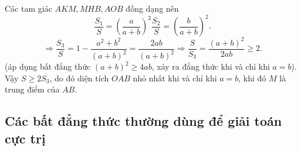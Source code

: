 \begin{vd}
{{
		}
		Các tam giác $AKM, MHB, AOB$ đồng dạng nên $$\frac{S_1}{S}=\left(\frac{a}{a+b}\right)^2 \frac{S_2}{S}=\left(\frac{b}{a+b}\right)^2.$$
		$$\Rightarrow \frac{S_3}{S}=1-\frac{a^2+b^2}{\left(a+b \right)^2}=\frac{2ab}{\left(a+b\right)^2} \Rightarrow \frac{S}{S_3}=\frac{\left(a+b\right)^2}{2ab}\geq 2.$$
		(áp dụng bất đẳng thức $\left( a+b\right)^2 \geq 4ab$, xảy ra đẳng thức khi và chỉ khi $a=b$).\\
		Vậy $S\geq 2S_3$, do đó diện tích $OAB$ nhỏ nhất khi và chỉ khi $a=b$, khi đó $M$ là trung điểm của $AB$.
	}
\end{vd}
\subsection{Các bất đẳng thức thường dùng để giải toán cực trị}
